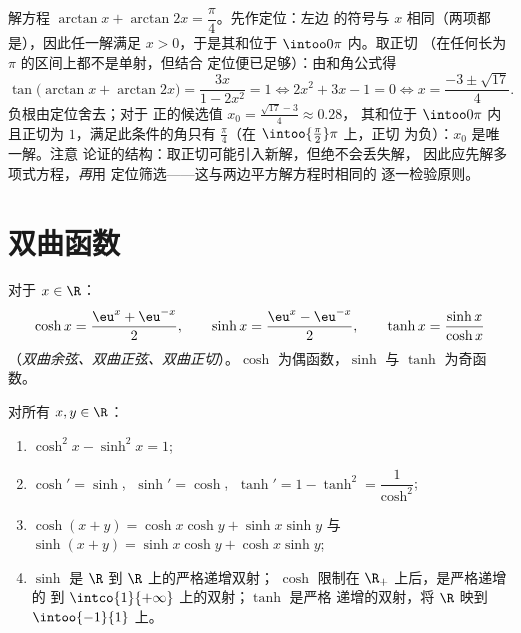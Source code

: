 \begin{example}[一个反正切方程]\label{ex:b1:functions:arctaneq}
解方程 $\arctan x + \arctan 2x = \dfrac\pi4$。先作定位：左边
的符号与 $x$ 相同（两项都是），因此任一解满足
$x > 0$，于是其和位于 $\intoo0\pi$ 内。取正切
（在任何长为 $\pi$ 的区间上都不是单射，但结合
定位便已足够）：由和角公式得
\[
\tan\bigl(\arctan x + \arctan 2x\bigr)
= \frac{3x}{1 - 2x^2} = 1
\iff 2x^2 + 3x - 1 = 0
\iff x = \frac{-3 \pm \sqrt{17}}4 .
\]
负根由定位舍去；对于
正的候选值 $x_0 = \frac{\sqrt{17} - 3}4 \approx 0.28$，
其和位于 $\intoo0\pi$ 内且正切为 $1$，满足此条件的角只有
$\frac\pi4$（在 $\intoo{\frac\pi2}\pi$ 上，正切
为负）：$x_0$ 是唯一解。注意
论证的结构：取正切可能引入新解，但绝不会丢失解，
因此应先解多项式方程，\emph{再}用
定位筛选——这与两边平方解方程时相同的
逐一检验原则。
\end{example}

\section{双曲函数}

\begin{definition}[$\cosh$, $\sinh$, $\tanh$]\label{def:b1:functions:hyperbolic}
对于 $x \in \R$：
\[
\cosh x = \frac{\eu^x + \eu^{-x}}{2},
\qquad
\sinh x = \frac{\eu^x - \eu^{-x}}{2},
\qquad
\tanh x = \frac{\sinh x}{\cosh x}
\]
（\emph{双曲余弦、双曲正弦、双曲正切}）。$\cosh$ 为偶函数，$\sinh$ 与 $\tanh$ 为奇函数。
\end{definition}

\begin{proposition}[基本性质]\label{prop:b1:functions:hyprules}
对所有 $x, y \in \R$：
\begin{enumerate}
  \item $\cosh^2 x - \sinh^2 x = 1$;
  \item $\cosh' = \sinh$, $\;\sinh' = \cosh$, $\;\tanh' = 1 - \tanh^2
        = \dfrac{1}{\cosh^2}$;
  \item $\cosh(x+y) = \cosh x\cosh y + \sinh x \sinh y$ 与
        $\sinh(x+y) = \sinh x \cosh y + \cosh x \sinh y$;
  \item $\sinh$ 是 $\R$ 到 $\R$ 上的严格递增双射；
        $\cosh$ 限制在 $\R_+$ 上后，是严格递增的
        到 $\intco{1}{+\infty}$ 上的双射；$\tanh$ 是严格
        递增的双射，将 $\R$ 映到 $\intoo{-1}{1}$ 上。
\end{enumerate}
\end{proposition}

